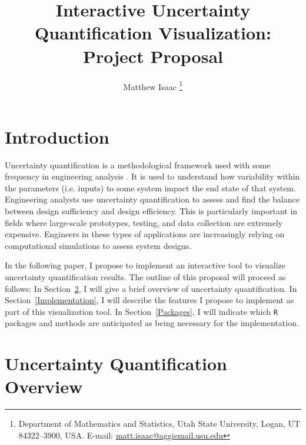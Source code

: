\documentclass[11pt]{asaproc}\usepackage[]{graphicx}\usepackage[]{color}
\title{Interactive Uncertainty Quantification Visualization: Project Proposal}
\author{Matthew Isaac \thanks{Department of Mathematics and Statistics, Utah State University, Logan, UT 84322--3900, USA. 
E-mail: \url{matt.isaac@aggiemail.usu.edu}}
}
\begin{document}
\renewcommand{\topfraction}{1.0}
\renewcommand{\bottomfraction}{1.0}
\renewcommand{\textfraction}{0.0}
\renewcommand{\floatpagefraction}{1.0}
\renewcommand{\dbltopfraction}{1.0}


\maketitle




\section{Introduction}
\label{Introduction}

Uncertainty quantification is a methodological framework used with some frequency in engineering analysis \citep{EW2018}. It is used to understand how variability  within the parameters (i.e. inputs) to some system impact the end state of that system. Engineering analysts use uncertainty quantification to assess and find the balance between design sufficiency and design efficiency. This is particularly important in fields where large-scale prototypes, testing, and data collection are extremely expensive. Engineers in these types of applications are increasingly relying on computational simulations to assess system designs.

In the following paper, I propose to implement an interactive tool to visualize uncertainty quantification results. The outline of this proposal will proceed as follows: In Section~\ref{UQOverview}, I will give a brief overview of uncertainty quantification. In Section~\ref{Implementation}, I will describe the features I propose to implement as part of this visualization tool. In Section~\ref{Packages}, I will indicate which {\tt R} packages and methods are anticipated as being necessary for the implementation.

\section{Uncertainty Quantification Overview}  
\label{UQOverview}
\end{document}
